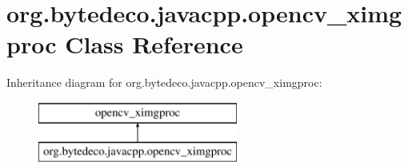 \hypertarget{classorg_1_1bytedeco_1_1javacpp_1_1opencv__ximgproc}{}\section{org.\+bytedeco.\+javacpp.\+opencv\+\_\+ximgproc Class Reference}
\label{classorg_1_1bytedeco_1_1javacpp_1_1opencv__ximgproc}
Inheritance diagram for org.\+bytedeco.\+javacpp.\+opencv\+\_\+ximgproc\+:\begin{figure}[H]
\begin{center}
\leavevmode
\includegraphics[height=2.000000cm]{classorg_1_1bytedeco_1_1javacpp_1_1opencv__ximgproc}
\end{center}
\end{figure}
